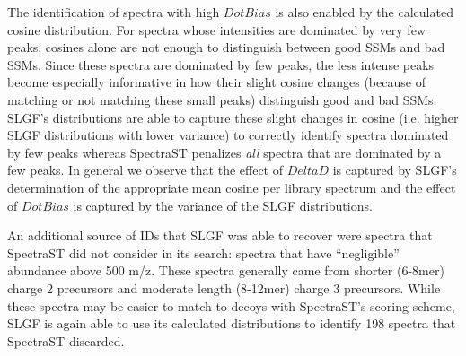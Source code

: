 \documentclass[endnotes,11pt]{article}
\begin{document}
The identification of spectra with high $DotBias$ is also enabled by the calculated cosine distribution. For spectra whose intensities are dominated by very few peaks, cosines alone are not enough to distinguish between good SSMs and bad SSMs. Since these spectra are dominated by few peaks, the less intense peaks become especially informative in how their slight cosine changes (because of matching or not matching these small peaks) distinguish good and bad SSMs. SLGF's distributions are able to capture these slight changes in cosine (i.e. higher SLGF distributions with lower variance) to correctly identify spectra dominated by few peaks whereas SpectraST penalizes \emph{all} spectra that are dominated by a few peaks. In general we observe that the effect of $DeltaD$ is captured by SLGF's determination of the appropriate mean cosine per library spectrum and the effect of $DotBias$ is captured by the variance of the SLGF distributions.

An additional source of IDs that SLGF was able to recover were spectra that SpectraST did not consider in its search: spectra that have ``negligible'' abundance above 500 m/z. These spectra generally came from shorter (6-8mer) charge 2 precursors and moderate length (8-12mer) charge 3 precursors. While these spectra may be easier to match to decoys with SpectraST's scoring scheme, SLGF is again able to use its calculated distributions to identify 198 spectra that SpectraST discarded.
\end{document}
